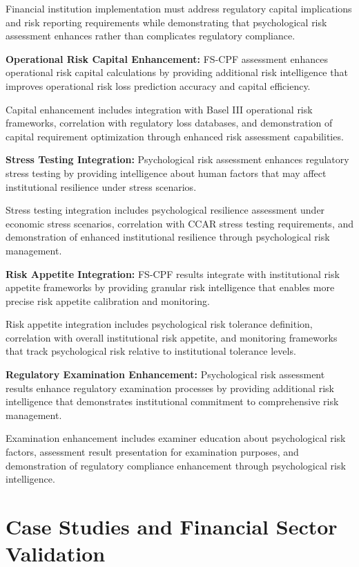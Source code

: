 \documentclass[10pt, twocolumn]{article}
\begin{document}
Financial institution implementation must address regulatory capital implications and risk reporting requirements while demonstrating that psychological risk assessment enhances rather than complicates regulatory compliance.

\textbf{Operational Risk Capital Enhancement:} FS-CPF assessment enhances operational risk capital calculations by providing additional risk intelligence that improves operational risk loss prediction accuracy and capital efficiency.

Capital enhancement includes integration with Basel III operational risk frameworks, correlation with regulatory loss databases, and demonstration of capital requirement optimization through enhanced risk assessment capabilities.

\textbf{Stress Testing Integration:} Psychological risk assessment enhances regulatory stress testing by providing intelligence about human factors that may affect institutional resilience under stress scenarios.

Stress testing integration includes psychological resilience assessment under economic stress scenarios, correlation with CCAR stress testing requirements, and demonstration of enhanced institutional resilience through psychological risk management.

\textbf{Risk Appetite Integration:} FS-CPF results integrate with institutional risk appetite frameworks by providing granular risk intelligence that enables more precise risk appetite calibration and monitoring.

Risk appetite integration includes psychological risk tolerance definition, correlation with overall institutional risk appetite, and monitoring frameworks that track psychological risk relative to institutional tolerance levels.

\textbf{Regulatory Examination Enhancement:} Psychological risk assessment results enhance regulatory examination processes by providing additional risk intelligence that demonstrates institutional commitment to comprehensive risk management.

Examination enhancement includes examiner education about psychological risk factors, assessment result presentation for examination purposes, and demonstration of regulatory compliance enhancement through psychological risk intelligence.

\section{Case Studies and Financial Sector Validation}
\end{document}
